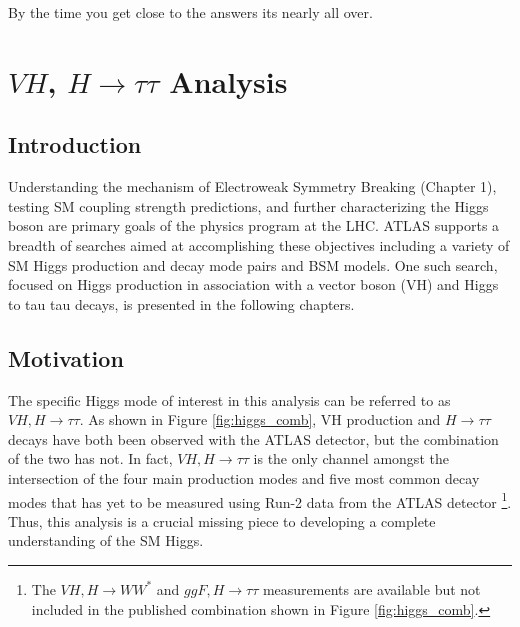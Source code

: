 \begin{savequote}[75mm]
By the time you get close to the answers its nearly all over.
\end{savequote}

\chapter{$VH$, $H\rightarrow \tau\tau$ Analysis}

\section{Introduction}
Understanding the mechanism of Electroweak Symmetry Breaking (Chapter 1), testing SM coupling strength predictions, and further characterizing the Higgs boson are primary goals of the physics program at the LHC. ATLAS supports a breadth of searches aimed at accomplishing these objectives including a variety of SM Higgs production and decay mode pairs and BSM models. One such search, focused on Higgs production in association with a vector boson (VH) and Higgs to tau tau decays, is presented in the following chapters.

\section{Motivation}
The specific Higgs mode of interest in this analysis can be referred to as $VH, H\rightarrow\tau\tau$. As shown in Figure \ref{fig:higgs_comb}, VH production and $H\rightarrow \tau\tau$ decays have both been observed  with the ATLAS detector, but the combination of the two has not. In fact, $VH,H\rightarrow\tau\tau$ is the only channel amongst the intersection of the four main production modes and five most common decay modes that has yet to be measured using Run-2 data from the ATLAS detector \cite{higgs_comb_paper}\footnote{The $VH,H\rightarrow WW^*$\cite{vh_hww_run2} and $ggF,H\rightarrow\tau\tau$\cite{htautau_run2} measurements are available but not included in the published combination shown in Figure \ref{fig:higgs_comb}.}. Thus, this analysis is a crucial missing piece to developing a complete understanding of the SM Higgs.\\

